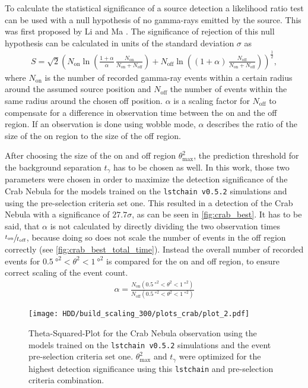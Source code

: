 To calculate the statistical significance of a source detection a likelihood ratio test can be used with a null hypothesis of no gamma-rays emitted by the source.
This was first proposed by Li and Ma \cite{Li_Ma}.
The significance of rejection of this null hypothesis can be calculated in units of the standard deviation $\sigma$ as
\begin{align}
    S = \sqrt{2} \left( 
        N_\text{on} \ln\left( \frac{1 + \alpha}{\alpha}\, \frac{N_\text{on}}{N_\text{on} + N_\text{off}} \right) + 
        N_\text{off} \ln\left( (1 + \alpha)\, \frac{N_\text{off}}{N_\text{on} + N_\text{off}} \right) 
    \right)^{\frac{1}{2}},
\end{align}
where $N_\text{on}$ is the number of recorded gamma-ray events within a certain radius around the assumed source position and $N_\text{off}$ the number of events within 
the same radius around the chosen off position. 
$\alpha$ is a scaling factor for $N_\text{off}$ to compensate for a difference in observation time between the on and the off region.
If an observation is done using wobble mode, $\alpha$ describes the ratio of the size of the on region to the size of the off region.

After choosing the size of the on and off region $\theta_\text{max}^2$, the prediction threshold for the background separation $t_\gamma$ has to be chosen as well.
In this work, those two parameters were chosen in order to maximize the detection significance of the Crab Nebula for the models trained on the 
\texttt{lstchain v0.5.2} simulations and using the pre-selection criteria set one.
This resulted in a detection of the Crab Nebula with a significance of $\num{27.7} \sigma$, as can be seen in \autoref{fig:crab_best}.
It has to be said, that $\alpha$ is not calculated by directly dividing the two observation times $\sfrac{t_\text{on}}{t_\text{off}}$, because doing so 
does not scale the number of events in the off region correctly (see \autoref{fig:crab_best_total_time}).
Instead the overall number of recorded events for $\SI{0.5}{\degree\squared} < \theta^2 < \SI{1}{\degree\squared}$ is compared for the on and off region,
to ensure correct scaling of the event count.
\begin{align}
    \alpha = \frac{N_\text{on}(\SI{0.5}{\degree\squared} < \theta^2 < \SI{1}{\degree\squared})}{N_\text{off}(\SI{0.5}{\degree\squared} < \theta^2 < \SI{1}{\degree\squared})}
\end{align}
\begin{figure}
    \centering
    \texttt{[image: HDD/build\_scaling\_300/plots\_crab/plot\_2.pdf]}
    \caption{Theta-Squared-Plot for the Crab Nebula observation using the models trained on the \texttt{lstchain v0.5.2} simulations and the event pre-selection criteria set one.
        $\theta_\text{max}^2$ and $t_\gamma$ were optimized for the highest detection significance using this \texttt{lstchain} and pre-selection criteria combination.
    }
    \label{fig:crab_best}
\end{figure}

